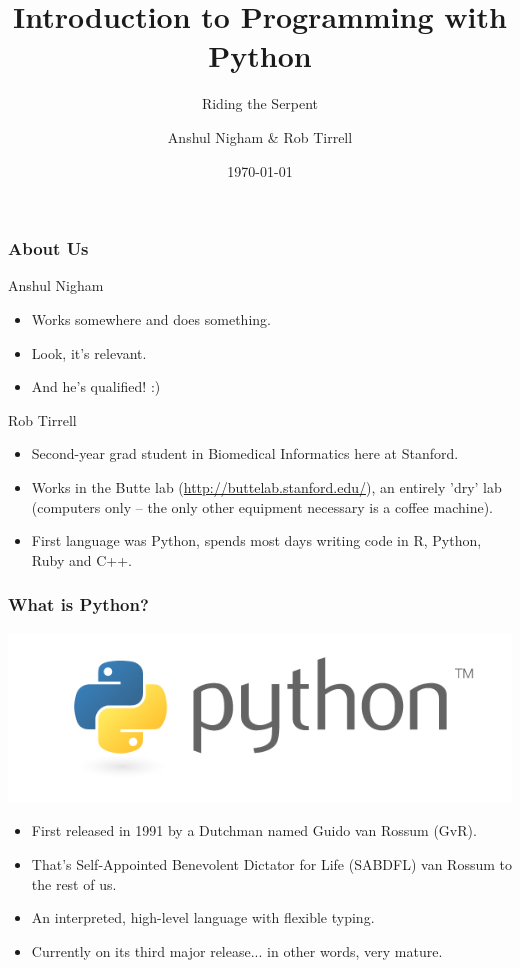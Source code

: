 \documentclass[10pt]{beamer}
\title{Introduction to Programming with Python}
\subtitle{Riding the Serpent}
\author{Anshul Nigham \& Rob Tirrell}
\date{\today}
\begin{document}
\begin{frame}
  \titlepage
\end{frame}

\begin{frame}
  \small
  \frametitle{About Us}
  \begin{block}{Anshul Nigham}
    \begin{itemize}
      \item Works somewhere and does something.
      \item Look, it's relevant.
      \item And he's qualified! :)
    \end{itemize}
  \end{block}
  \begin{block}{Rob Tirrell}
    \begin{itemize}
      \item Second-year grad student in Biomedical Informatics here at Stanford.
      \item Works in the Butte lab (\href{http://buttelab.stanford.edu/}{http://buttelab.stanford.edu/}), an entirely 'dry' lab (computers only -- the only other equipment necessary is a coffee machine).
      \item First language was Python, spends most days writing code in R, Python, Ruby and C++.
    \end{itemize}
  \end{block}
\end{frame}

\begin{frame}
  \frametitle{What is Python?}
  \centering
  \includegraphics[scale=0.5]{PythonLogo.png} \\
  \begin{itemize}
    \item First released in 1991 by a Dutchman named Guido van Rossum (GvR).
    \item That's Self-Appointed Benevolent Dictator for Life (SABDFL) van Rossum to the rest of us.
    \item An interpreted, high-level language with flexible typing.
    \item Currently on its third major release... in other words, very mature.
  \end{itemize}
\end{frame}
\end{document}
